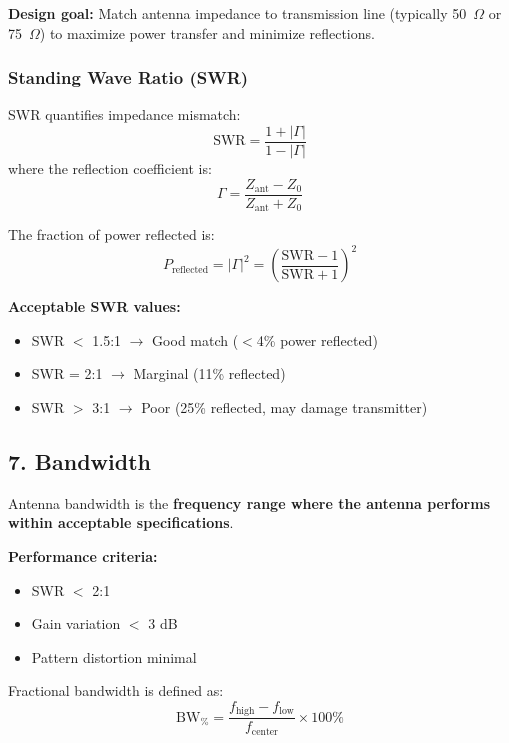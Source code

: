\textbf{Design goal:} Match antenna impedance to transmission line (typically 50~$\Omega$ or 75~$\Omega$) to maximize power transfer and minimize reflections.

\subsubsection{Standing Wave Ratio (SWR)}

SWR quantifies impedance mismatch:
\begin{equation}
\text{SWR} = \frac{1 + |\Gamma|}{1 - |\Gamma|}
\label{eq:swr}
\end{equation}
where the reflection coefficient is:
\begin{equation}
\Gamma = \frac{Z_{\text{ant}} - Z_0}{Z_{\text{ant}} + Z_0}
\label{eq:reflection-coefficient}
\end{equation}

The fraction of power reflected is:
\begin{equation}
P_{\text{reflected}} = |\Gamma|^2 = \left(\frac{\text{SWR} - 1}{\text{SWR} + 1}\right)^2
\label{eq:reflected-power}
\end{equation}

\textbf{Acceptable SWR values:}
\begin{itemize}
\item SWR $<$ 1.5:1 $\rightarrow$ Good match ($<$4\% power reflected)
\item SWR = 2:1 $\rightarrow$ Marginal (11\% reflected)
\item SWR $>$ 3:1 $\rightarrow$ Poor (25\% reflected, may damage transmitter)
\end{itemize}

\subsection{7. Bandwidth}

Antenna bandwidth is the \textbf{frequency range where the antenna performs within acceptable specifications}.

\textbf{Performance criteria:}
\begin{itemize}
\item SWR $<$ 2:1
\item Gain variation $<$ 3 dB
\item Pattern distortion minimal
\end{itemize}

Fractional bandwidth is defined as:
\begin{equation}
\text{BW}_{\%} = \frac{f_{\text{high}} - f_{\text{low}}}{f_{\text{center}}} \times 100\%
\label{eq:fractional-bandwidth}
\end{equation}

